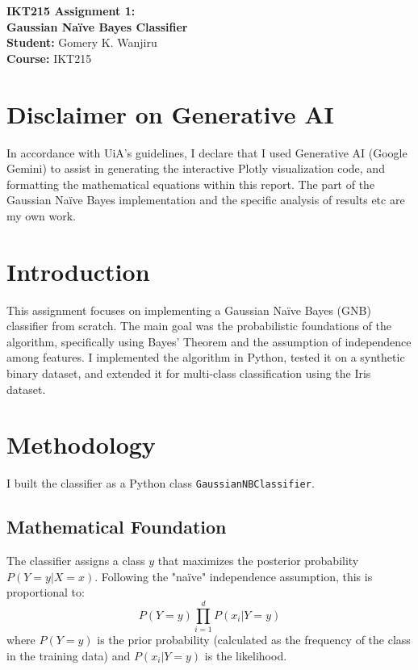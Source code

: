 \documentclass[11pt]{article}
\begin{document}
\begin{titlepage}
    \centering
    \vspace*{2cm}
    \Huge\textbf{IKT215 Assignment 1: \\ Gaussian Naïve Bayes Classifier} \\
    \vspace{1.5cm}
    \Large \textbf{Student:} Gomery K. Wanjiru \\
    \Large \textbf{Course:} IKT215 \\
    \vfill
    \section*{Disclaimer on Generative AI}
    In accordance with UiA's guidelines, I declare that I used Generative AI (Google Gemini) to assist in generating the interactive Plotly visualization code, and formatting the mathematical equations within this report. The part of the Gaussian Naïve Bayes implementation and the specific analysis of results etc are my own work.
\end{titlepage}

\newpage
\section{Introduction}
This assignment focuses on implementing a Gaussian Naïve Bayes (GNB) classifier from scratch. The main goal was the probabilistic foundations of the algorithm, specifically using Bayes' Theorem and the assumption of independence among features. I implemented the algorithm in Python, tested it on a synthetic binary dataset, and extended it for multi-class classification using the Iris dataset.

\section{Methodology}
I built the classifier as a Python class \texttt{GaussianNBClassifier}.

\subsection{Mathematical Foundation}
The classifier assigns a class $y$ that maximizes the posterior probability $P(Y=y|X=x)$. Following the "naïve" independence assumption, this is proportional to:
\begin{equation}
P(Y=y) \prod_{i=1}^{d} P(x_i|Y=y)
\end{equation}
where $P(Y=y)$ is the prior probability (calculated as the frequency of the class in the training data) and $P(x_i|Y=y)$ is the likelihood.
\end{document}
